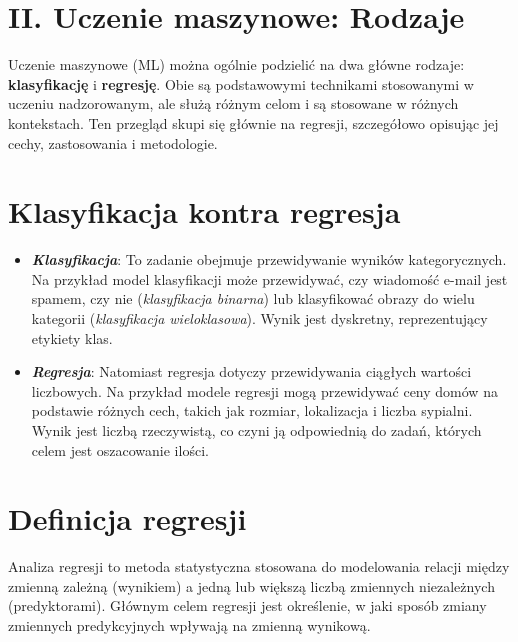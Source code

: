 {}
\justify
\fontsize{14}{16}\selectfont
\setlength{\parindent}{0pt}
\section*{II. Uczenie maszynowe: Rodzaje \cite{alma991000280759708832}}
\fontsize{12}{14}\selectfont
\vspace{-1.0em}

Uczenie maszynowe (ML) można ogólnie podzielić na dwa główne rodzaje: \textbf{klasyfikację} i \textbf{regresję}. Obie są podstawowymi technikami stosowanymi w uczeniu nadzorowanym, ale służą różnym celom i są stosowane w różnych kontekstach. Ten przegląd skupi się głównie na regresji, szczegółowo opisując jej cechy, zastosowania i metodologie.

{}
\section*{Klasyfikacja kontra regresja}

\vspace{-1.0em}

\begin{itemize}
    \item \textbf{\textit{Klasyfikacja}}: To zadanie obejmuje przewidywanie wyników kategorycznych. Na przykład model klasyfikacji może przewidywać, czy wiadomość e-mail jest spamem, czy nie (\textit{klasyfikacja binarna}) lub klasyfikować obrazy do wielu kategorii (\textit{klasyfikacja wieloklasowa}). Wynik jest dyskretny, reprezentujący etykiety klas.
    \item \textit{\textbf{Regresja}}: Natomiast regresja dotyczy przewidywania ciągłych wartości liczbowych. Na przykład modele regresji mogą przewidywać ceny domów na podstawie różnych cech, takich jak rozmiar, lokalizacja i liczba sypialni. Wynik jest liczbą rzeczywistą, co czyni ją odpowiednią do zadań, których celem jest oszacowanie ilości.
\end{itemize}

\section*{Definicja regresji}

\vspace{-1.0em}

Analiza regresji to metoda statystyczna stosowana do modelowania relacji między zmienną zależną (wynikiem) a jedną lub większą liczbą zmiennych niezależnych (predyktorami). Głównym celem regresji jest określenie, w jaki sposób zmiany zmiennych predykcyjnych wpływają na zmienną wynikową.

